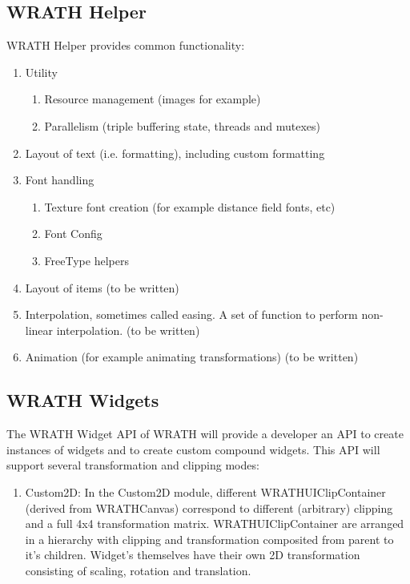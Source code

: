 \documentclass[a4paper,11pt]{article}
\begin{document}
\begin{indenter}{2cm}
\subsection{WRATH Helper}
\begin{indenter}{1cm}
WRATH Helper provides common functionality:
\begin{enumerate}
\item Utility
\begin{enumerate}
\item Resource management (images for example)
\item Parallelism (triple buffering state, threads and mutexes) 
\end{enumerate} 
\item Layout of text (i.e. formatting), including custom formatting
\item Font handling 
\begin{enumerate}
\item Texture font creation (for example distance field fonts, etc)
\item Font Config
\item FreeType helpers 
\end{enumerate} 
\item Layout of items (to be written)
\item Interpolation, sometimes called easing. A set of function to perform non-linear interpolation. (to be written)
\item Animation (for example animating transformations) (to be written)   
\end{enumerate}
\end{indenter}

\subsection{WRATH Widgets}
\begin{indenter}{1cm}
The WRATH Widget API of WRATH will provide a developer an API to create instances of widgets and to create custom compound widgets. This API will support several transformation and clipping modes:
\begin{enumerate} 
\item Custom2D: In the Custom2D module, different WRATHUIClipContainer (derived from WRATHCanvas) correspond to different (arbitrary) clipping and a full 4x4 transformation matrix. WRATHUIClipContainer are arranged in a hierarchy with clipping and transformation composited from parent to it's children. Widget's themselves have their own 2D transformation consisting of scaling, rotation and translation.


\end{enumerate}
\end{indenter}
\end{indenter}
\end{document}
